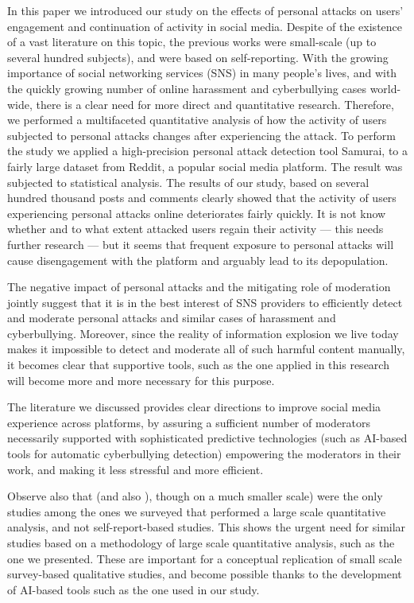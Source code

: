 \documentclass[a4paper,fleqn]{cas-dc}
\begin{document}
In this paper we introduced our study on the effects of personal attacks
on users' engagement and continuation of activity in social media.
Despite of the existence of a vast literature on this topic, the
previous works were small-scale (up to several hundred subjects), and
were based on self-reporting. With the growing importance of social
networking services (SNS) in many people's lives, and with the quickly
growing number of online harassment and cyberbullying cases world-wide,
there is a clear need for more direct and quantitative research.
Therefore, we performed a multifaceted quantitative analysis of how the
activity of users subjected to personal attacks changes after
experiencing the attack. To perform the study we applied a
high-precision personal attack detection tool \textsf{Samurai,} to a
fairly large dataset from Reddit, a popular social media platform. The
result was subjected to statistical analysis. The results of our study,
based on several hundred thousand posts and comments clearly showed that
the activity of users experiencing personal attacks online deteriorates
fairly quickly. It is not know whether and to what
extent attacked users regain their activity --- this needs further
research --- but it seems that   frequent exposure to personal attacks
will cause disengagement with the platform and arguably lead to its
depopulation.

The negative impact of personal attacks and the mitigating role of
moderation jointly suggest that it is in the best interest of SNS
providers to efficiently detect and moderate personal attacks and
similar cases of harassment and cyberbullying. Moreover, since the
reality of information explosion we live today makes it impossible to
detect and moderate all of such harmful content manually, it becomes
clear that supportive tools, such as the one applied in this research
will become more and more necessary for this purpose.

The literature we discussed provides clear directions to improve social
media experience across platforms, by assuring a sufficient number of
moderators necessarily supported with sophisticated predictive
technologies (such as AI-based tools for automatic cyberbullying
detection) empowering the moderators in their work, and making it less
stressful and more efficient.

Observe also that \citep{chandrasekharan2017you} (and also \citep{pudipeddi2014user}), though on a much smaller scale) were the only studies among
the ones we surveyed that performed a large scale quantitative analysis,
and not self-report-based studies. This shows the urgent need for
similar studies based on a methodology of large scale quantitative
analysis, such as the one we presented. These are important for a
conceptual replication of small scale survey-based qualitative studies,
and become possible thanks to the development of AI-based tools such as
the one used in our study.
\end{document}
